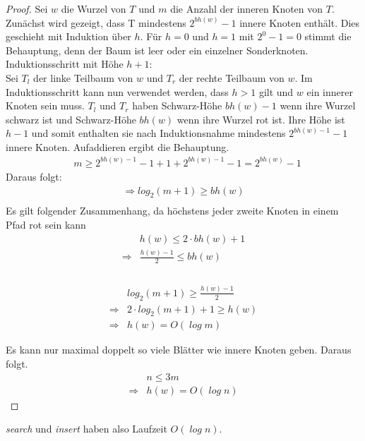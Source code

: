 \documentclass[a4paper,12pt]{article}
\begin{document}
\begin{proof}
	Sei $w$ die Wurzel von $T$ und $m$ die Anzahl der inneren Knoten von $T$. 
	Zunächst wird gezeigt, dass T mindestens $2^\mathit{bh(w)} - 1$ innere Knoten enthält.
	Dies geschieht mit Induktion über $h$. Für $h = 0$ und  $h = 1$ mit $2^0 - 1 = 0 $ stimmt die Behauptung, denn der Baum ist leer oder ein einzelner Sonderknoten.  
    Induktionsschritt mit Höhe $h + 1$:\\
    Sei $T_l$ der linke Teilbaum von $w$ und $T_r$ der rechte Teilbaum von $w$.  
    Im Induktionsschritt kann nun verwendet werden, dass $h > 1$ gilt und $w$ ein innerer Knoten sein muss. $T_l$ und $T_r$ haben Schwarz-Höhe $\mathit{bh(w)} - 1$ wenn ihre Wurzel schwarz ist und Schwarz-Höhe $\mathit{bh(w)}$ wenn ihre Wurzel rot ist. Ihre Höhe ist $h-1$ und somit enthalten sie nach Induktionsnahme mindestens  $2^\mathit{bh(w)- 1} - 1$ innere Knoten. Aufaddieren ergibt die Behauptung.\\    
    \begin{align*}
    &m \geq 2^\mathit{bh(w)- 1} - 1  + 1  + 2^\mathit{bh(w)- 1} - 1 = 2^\mathit{bh(w)} - 1
    \end{align*}
   Daraus folgt:\\
   \begin{align*}
    \Rightarrow  log_2(m + 1) \geq\mathit{bh(w)}\\ 
    \end{align*}
    \noindent Es gilt folgender Zusammenhang, da höchstens jeder zweite Knoten in einem Pfad rot sein kann\\
    \begin{align*}
    &\mathit{h(w)} \leq 2 \cdot \mathit{bh(w) } + 1 \\
    \Rightarrow &\frac{\mathit{h(w)} - 1}{2} \leq\mathit{bh(w) } \\
    \end{align*}
    \\
    \begin{align*}
    &log_2(m + 1) \geq\frac{\mathit{h(w)} - 1}{2} \\
    \Rightarrow	&2 \cdot log_2(m + 1) + 1 \geq\mathit{h(w)} \\
    \Rightarrow &\mathit{h(w)} = \mathit{O(\log {m})} 
    \end{align*}
  	
	
    
    

    
     \noindent Es kann nur maximal doppelt so viele Blätter wie innere Knoten geben. Daraus folgt.
   \begin{align*}
   &n  \leq 3 m \\
    \Rightarrow &\mathit{h(w)} = \mathit{O(\log {n})} 
   \end{align*} 
  
   
\end{proof}
\noindent \textit{search} und \textit{insert} haben also Laufzeit $\mathit{O(\log {n})}$.
\end{document}
